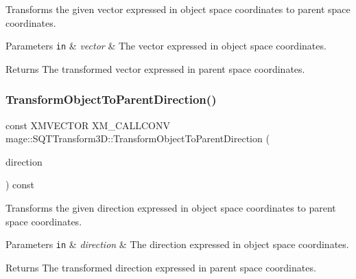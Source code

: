 Transforms the given vector expressed in object space coordinates to parent space coordinates.


\begin{DoxyParams}[1]{Parameters}
\mbox{\tt in}  & {\em vector} & The vector expressed in object space coordinates. \\
\hline
\end{DoxyParams}
\begin{DoxyReturn}{Returns}
The transformed vector expressed in parent space coordinates. 
\end{DoxyReturn}
\mbox{\label{classmage_1_1_s_q_t_transform3_d_aa32b13722dba2fb2a10ee9abb852219d}} 
\subsubsection{\texorpdfstring{Transform\+Object\+To\+Parent\+Direction()}{TransformObjectToParentDirection()}}
{\footnotesize\ttfamily const X\+M\+V\+E\+C\+T\+OR X\+M\+\_\+\+C\+A\+L\+L\+C\+O\+NV mage\+::\+S\+Q\+T\+Transform3\+D\+::\+Transform\+Object\+To\+Parent\+Direction (\begin{DoxyParamCaption}\item[{F\+X\+M\+V\+E\+C\+T\+OR}]{direction }\end{DoxyParamCaption}) const\hspace{0.3cm}{\ttfamily [noexcept]}}

Transforms the given direction expressed in object space coordinates to parent space coordinates.


\begin{DoxyParams}[1]{Parameters}
\mbox{\tt in}  & {\em direction} & The direction expressed in object space coordinates. \\
\hline
\end{DoxyParams}
\begin{DoxyReturn}{Returns}
The transformed direction expressed in parent space coordinates. 
\end{DoxyReturn}
\mbox{\label{classmage_1_1_s_q_t_transform3_d_a5bf23f9530549a133729efbb2ada306c}} 
